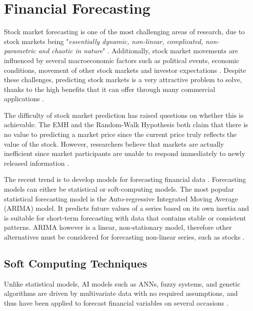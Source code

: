 \documentclass{UoYCSproject}
\begin{document}
\section{Financial Forecasting}
\label{sec:fiforcasting}
Stock market forecasting is one of the most challenging areas of research, due to stock markets being "\textit{essentially dynamic, non-linear, complicated, non-parametric and chaotic in nature}" \cite{tan2005brain}. Additionally, stock market movements are influenced by several macroeconomic factors such as political events, economic conditions, movement of other stock markets and investor expectations \cite{zhang2009stock}. Despite these challenges, predicting stock markets is a very attractive problem to solve, thanks to the high benefits that it can offer through many commercial applications \cite{majhi2007stock}. 

The difficulty of stock market prediction has raised questions on whether this is achievable. The EMH and the Random-Walk Hypothesis both claim that there is no value to predicting a market price since the current price truly reflects the value of the stock. However, researchers believe that markets are actually inefficient since market participants are unable to respond immediately to newly released information \cite{jensen1978some}. 

The recent trend is to develop models for forecasting financial data \cite{majhi2007stock}. Forecasting models can either be statistical or soft-computing models. The most popular statistical forecasting model is the Auto-regressive Integrated Moving Average (ARIMA) model. It predicts future values of a series based on its own inertia and is suitable for short-term forecasting with data that contains stable or consistent patterns. ARIMA however is a linear, non-stationary model, therefore other alternatives must be considered for forecasting non-linear series, such as stocks \cite{wang1996stock}. 

\subsection{Soft Computing Techniques}
Unlike statistical models, AI models such as ANNs, fuzzy systems, and genetic algorithms are driven by multivariate data with no required assumptions, and thus have been applied to forecast financial variables on several occasions \cite{zhong2017forecasting}. 
\end{document}
